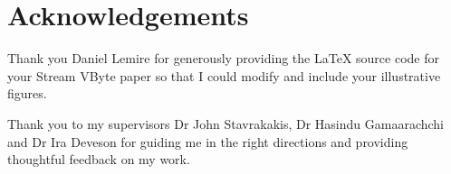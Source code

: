 \chapter*{Acknowledgements}

Thank you Daniel Lemire for generously providing the LaTeX source code for your
Stream VByte paper \cite{svb} so that I could modify and include your
illustrative figures.

Thank you to my supervisors Dr John Stavrakakis, Dr Hasindu Gamaarachchi and Dr
Ira Deveson for guiding me in the right directions and providing thoughtful
feedback on my work.
